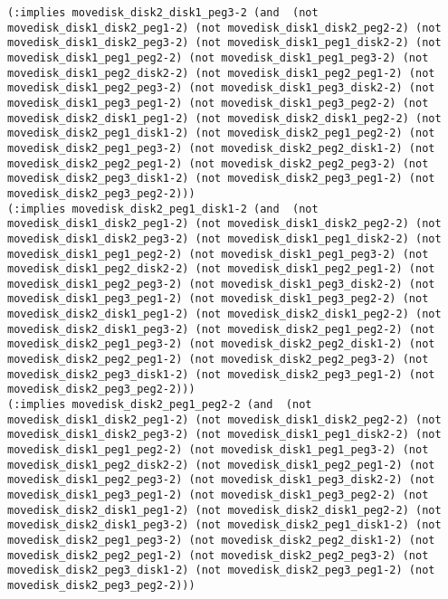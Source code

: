 \documentclass[12pt,letterpaper]{ntdhw}
\begin{document}
\begin{enumerate}
\begin{enumerate}
\begin{lstlisting}[language=pddl, style=pddlstyle,
  basicstyle=\scriptsize]
(:implies movedisk_disk2_disk1_peg3-2 (and  (not movedisk_disk1_disk2_peg1-2) (not movedisk_disk1_disk2_peg2-2) (not movedisk_disk1_disk2_peg3-2) (not movedisk_disk1_peg1_disk2-2) (not movedisk_disk1_peg1_peg2-2) (not movedisk_disk1_peg1_peg3-2) (not movedisk_disk1_peg2_disk2-2) (not movedisk_disk1_peg2_peg1-2) (not movedisk_disk1_peg2_peg3-2) (not movedisk_disk1_peg3_disk2-2) (not movedisk_disk1_peg3_peg1-2) (not movedisk_disk1_peg3_peg2-2) (not movedisk_disk2_disk1_peg1-2) (not movedisk_disk2_disk1_peg2-2) (not movedisk_disk2_peg1_disk1-2) (not movedisk_disk2_peg1_peg2-2) (not movedisk_disk2_peg1_peg3-2) (not movedisk_disk2_peg2_disk1-2) (not movedisk_disk2_peg2_peg1-2) (not movedisk_disk2_peg2_peg3-2) (not movedisk_disk2_peg3_disk1-2) (not movedisk_disk2_peg3_peg1-2) (not movedisk_disk2_peg3_peg2-2)))
(:implies movedisk_disk2_peg1_disk1-2 (and  (not movedisk_disk1_disk2_peg1-2) (not movedisk_disk1_disk2_peg2-2) (not movedisk_disk1_disk2_peg3-2) (not movedisk_disk1_peg1_disk2-2) (not movedisk_disk1_peg1_peg2-2) (not movedisk_disk1_peg1_peg3-2) (not movedisk_disk1_peg2_disk2-2) (not movedisk_disk1_peg2_peg1-2) (not movedisk_disk1_peg2_peg3-2) (not movedisk_disk1_peg3_disk2-2) (not movedisk_disk1_peg3_peg1-2) (not movedisk_disk1_peg3_peg2-2) (not movedisk_disk2_disk1_peg1-2) (not movedisk_disk2_disk1_peg2-2) (not movedisk_disk2_disk1_peg3-2) (not movedisk_disk2_peg1_peg2-2) (not movedisk_disk2_peg1_peg3-2) (not movedisk_disk2_peg2_disk1-2) (not movedisk_disk2_peg2_peg1-2) (not movedisk_disk2_peg2_peg3-2) (not movedisk_disk2_peg3_disk1-2) (not movedisk_disk2_peg3_peg1-2) (not movedisk_disk2_peg3_peg2-2)))
(:implies movedisk_disk2_peg1_peg2-2 (and  (not movedisk_disk1_disk2_peg1-2) (not movedisk_disk1_disk2_peg2-2) (not movedisk_disk1_disk2_peg3-2) (not movedisk_disk1_peg1_disk2-2) (not movedisk_disk1_peg1_peg2-2) (not movedisk_disk1_peg1_peg3-2) (not movedisk_disk1_peg2_disk2-2) (not movedisk_disk1_peg2_peg1-2) (not movedisk_disk1_peg2_peg3-2) (not movedisk_disk1_peg3_disk2-2) (not movedisk_disk1_peg3_peg1-2) (not movedisk_disk1_peg3_peg2-2) (not movedisk_disk2_disk1_peg1-2) (not movedisk_disk2_disk1_peg2-2) (not movedisk_disk2_disk1_peg3-2) (not movedisk_disk2_peg1_disk1-2) (not movedisk_disk2_peg1_peg3-2) (not movedisk_disk2_peg2_disk1-2) (not movedisk_disk2_peg2_peg1-2) (not movedisk_disk2_peg2_peg3-2) (not movedisk_disk2_peg3_disk1-2) (not movedisk_disk2_peg3_peg1-2) (not movedisk_disk2_peg3_peg2-2)))

\end{lstlisting}
\end{enumerate}
\end{enumerate}
\end{document}
